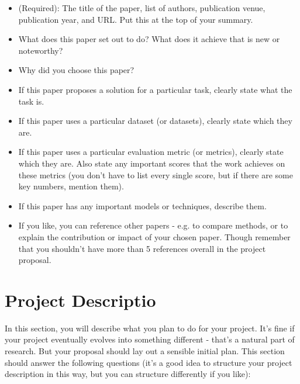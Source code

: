 \documentclass[10pt,twocolumn,letterpaper]{article}
\begin{document}
\begin{itemize}
\item (Required): The title of the paper, list of authors, publication venue, publication year, and URL. Put this at the top of your summary.
\item What does this paper set out to do? What does it achieve that is new or noteworthy?
\item Why did you choose this paper?
\item If this paper proposes a solution for a particular task, clearly state what the task is.
\item If this paper uses a particular dataset (or datasets), clearly state which they are.
\item If this paper uses a particular evaluation metric (or metrics), clearly state which they are. Also state any important scores that the work achieves on these metrics (you don't have to list every single score, but if there are some key numbers, mention them).
\item If this paper has any important models or techniques, describe them.
\item If you like, you can reference other papers - e.g. to compare methods, or to explain the contribution or impact of your chosen paper. Though remember that you shouldn't have more than 5 references overall in the project proposal.
\end{itemize}


\section{Project Descriptio}

In this section, you will describe what you plan to do for your project. It's fine if your project eventually evolves into something different - that's a natural part of research. But your proposal should lay out a sensible initial plan. This section should answer the following questions (it's a good idea to structure your project description in this way, but you can structure differently if you like):
\end{document}
